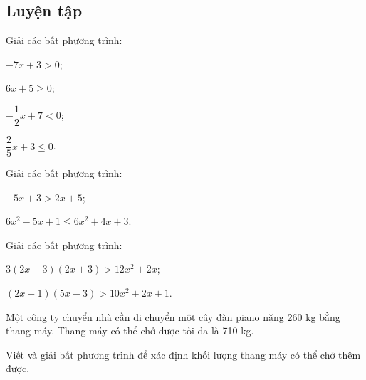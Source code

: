 \begin{practice}
    \subsection{Luyện tập}

    \begin{questions}[resume=SBT]
        \item Giải các bất phương trình:
        \begin{questions}
            \item $-7x+3>0$;

            \answerline
            \item $6x+5\geq 0$;

            \answerline
            \item $-\dfrac{1}{2}x+7<0$;

            \answerline
            \item $\dfrac{2}{5}x+3\leq 0$.

            \answerline
        \end{questions}

        \item Giải các bất phương trình:
        \begin{questions}
            \item $-5x+3>2x+5$;

            \answerline
            \item $6x^2-5x+1\leq 6x^2+4x+3$.

            \answerline
        \end{questions}

        \item Giải các bất phương trình:
        \begin{questions}
            \item $3(2x-3)(2x+3)>12x^2+2x$;

            \answerline
            \item $(2x+1)(5x-3)>10x^2+2x+1$.

            \answerline
        \end{questions}

        \item Một công ty chuyển nhà cần di chuyển một cây đàn piano nặng 260 kg bằng thang máy. Thang máy có thể chở được tối đa là 710 kg.
        \begin{questions}
            \item Viết và giải bất phương trình để xác định khối lượng thang máy có thể chở thêm được.


\end{questions}
\end{questions}
\end{practice}
